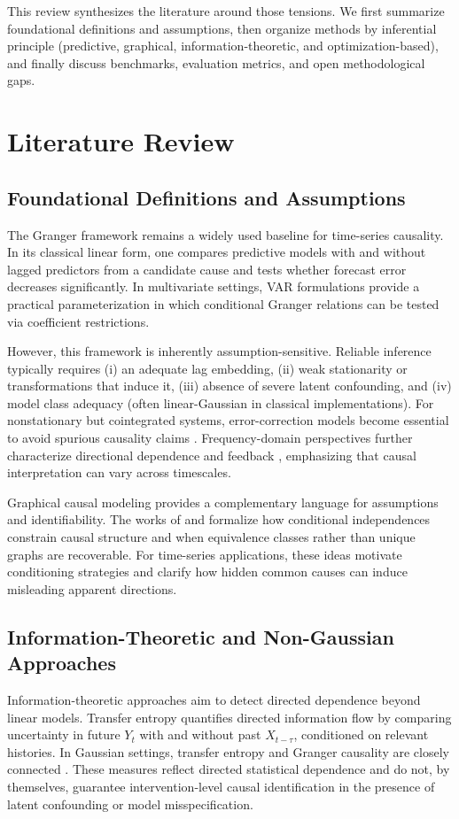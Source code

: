 \documentclass[11pt]{article}
\begin{document}
This review synthesizes the literature around those tensions. We first summarize foundational definitions and assumptions, then organize methods by inferential principle (predictive, graphical, information-theoretic, and optimization-based), and finally discuss benchmarks, evaluation metrics, and open methodological gaps.

\section{Literature Review}
\subsection{Foundational Definitions and Assumptions}
The Granger framework \citep{granger1969} remains a widely used baseline for time-series causality. In its classical linear form, one compares predictive models with and without lagged predictors from a candidate cause and tests whether forecast error decreases significantly. In multivariate settings, VAR formulations \citep{sims1980,lutkepohl2005} provide a practical parameterization in which conditional Granger relations can be tested via coefficient restrictions.

However, this framework is inherently assumption-sensitive. Reliable inference typically requires (i) an adequate lag embedding, (ii) weak stationarity or transformations that induce it, (iii) absence of severe latent confounding, and (iv) model class adequacy (often linear-Gaussian in classical implementations). For nonstationary but cointegrated systems, error-correction models become essential to avoid spurious causality claims \citep{engle1987}. Frequency-domain perspectives further characterize directional dependence and feedback \citep{geweke1982}, emphasizing that causal interpretation can vary across timescales.

Graphical causal modeling provides a complementary language for assumptions and identifiability. The works of \citet{spirtes2000} and \citet{pearl2000} formalize how conditional independences constrain causal structure and when equivalence classes rather than unique graphs are recoverable. For time-series applications, these ideas motivate conditioning strategies and clarify how hidden common causes can induce misleading apparent directions.

\subsection{Information-Theoretic and Non-Gaussian Approaches}
Information-theoretic approaches aim to detect directed dependence beyond linear models. Transfer entropy \citep{schreiber2000} quantifies directed information flow by comparing uncertainty in future $Y_t$ with and without past $X_{t-\tau}$, conditioned on relevant histories. In Gaussian settings, transfer entropy and Granger causality are closely connected \citep{barnett2009}. These measures reflect directed statistical dependence and do not, by themselves, guarantee intervention-level causal identification in the presence of latent confounding or model misspecification.
\end{document}
